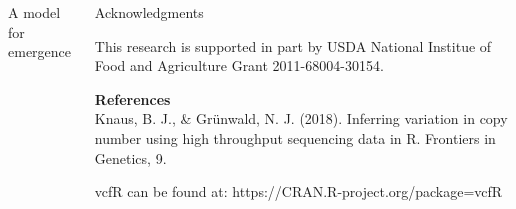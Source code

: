 \begin{columns}[t]
\begin{column}{0.71\textwidth}
\begin{block}{\large A model for emergence}
    \end{block}
  \end{column}

  \begin{column}{0.22\textwidth}
    \begin{block}{\large Acknowledgments}
\tiny
\vspace{10mm}

This research is supported in part by USDA National Institue of Food and Agriculture Grant 2011-68004-30154.
\newline
\vspace{5mm}

\textbf{References}\\
Knaus, B. J., \& Gr\"unwald, N. J. (2018). Inferring variation in copy number using high throughput sequencing data in R. Frontiers in Genetics, 9.
\newline
\vspace{1cm}

vcfR can be found at:
https://CRAN.R-project.org/package=vcfR
\vspace{1cm}

    \end{block}
  \end{column}
\end{columns}


